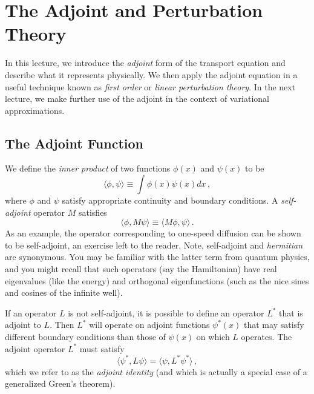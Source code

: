 \chapter{The Adjoint and Perturbation Theory}
\label{lec:adjoint}

In this lecture, we introduce the \textit{ adjoint} form of the transport equation and describe what it represents physically.  We then apply the adjoint equation in a useful technique known as \textit{first order} or \textit{linear perturbation theory}.  In the next lecture, we make further use of the adjoint in the context of variational approximations.

\section*{The Adjoint Function}

We define the \textit{ inner product} of two  functions $\phi(x)$ and $\psi(x)$ to be
\begin{equation}
  \langle \phi, \psi \rangle \equiv \int \phi(x) \psi(x) dx \, ,
\end{equation}
where $\phi$ and $\psi$ satisfy appropriate continuity and boundary conditions.  A \textit{self-adjoint} operator $M$ satisfies
\begin{equation}
  \langle \phi, M \psi \rangle \equiv  \langle M \phi, \psi \rangle  \, .
\end{equation}
As an example, the operator corresponding to one-speed diffusion can be shown to be self-adjoint, an exercise left to the reader.  Note, self-adjoint and \textit{hermitian} are synonymous.  You may be familiar with the latter term from quantum physics, and you might recall that such operators (say the Hamiltonian) have real eigenvalues (like the energy) and orthogonal eigenfunctions (such as the nice sines and cosines of the infinite well).

If an operator $L$ is not self-adjoint, it is possible to define an operator $L^*$ that is adjoint to $L$.  Then $L^*$ will operate on adjoint functions $\psi^*(x)$ that may satisfy different boundary conditions than those of $\psi(x)$ on which $L$ operates.  The adjoint operator $L^*$ must satisfy
\begin{equation}
  \langle \psi^*, L \psi \rangle =  \langle \psi, L^* \psi^* \rangle  \, ,
  \label{eq:adjointidentity}
\end{equation}
which we refer to as the \textit{adjoint identity} (and which is actually a special case of a generalized Green's theorem).

